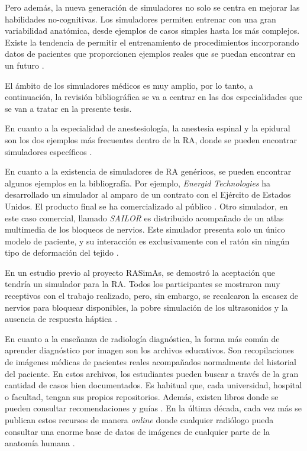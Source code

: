 Pero además, la nueva generación de simuladores no solo se centra en mejorar las habilidades no-cognitivas. Los simuladores permiten entrenar con una gran variabilidad anatómica, desde ejemplos de casos simples hasta los más complejos. Existe la tendencia de permitir el entrenamiento de procedimientos incorporando datos de pacientes que proporcionen ejemplos reales que se puedan encontrar en un futuro \cite{Willaert2012, ZHANG2017599}. 

El ámbito de los simuladores médicos es muy amplio, por lo tanto, a continuación, la revisión bibliográfica se va a centrar en las dos especialidades que se van a tratar en la presente tesis.


En cuanto a la especialidad de anestesiología, la anestesia espinal y la epidural son los dos ejemplos más frecuentes dentro de la \ac{RA}, donde se pueden encontrar simuladores específicos \cite{broom2018evaluation}. %

En cuanto a la existencia de simuladores de \ac{RA} genéricos, se pueden encontrar algunos ejemplos en la bibliografía. Por ejemplo, \emph{Energid Technologies} ha desarrollado  un simulador al amparo de un contrato con el Ejército de Estados Unidos. El producto final  se ha comercializado al público \cite{lim2008simulation}.
Otro simulador, en este caso comercial, llamado \emph{SAILOR} es distribuido acompañado de un atlas multimedia de los bloqueos de nervios. Este simulador presenta solo un único modelo de paciente, y su interacción es exclusivamente con el ratón sin ningún tipo de deformación del tejido \cite{Bibin}. 

En un estudio previo al proyecto \ac{RASimAs}, se demostró la aceptación que tendría un simulador para la \ac{RA}. Todos los participantes se mostraron muy receptivos con el trabajo realizado, pero, sin embargo, se recalcaron la escasez de nervios para bloquear disponibles, la pobre simulación de los ultrasonidos y la ausencia de respuesta háptica \cite{Grottke2009594}.


En cuanto a la enseñanza de radiología diagnóstica, la forma más común de aprender diagnóstico por imagen son los archivos educativos. Son recopilaciones de imágenes médicas de pacientes reales acompañados normalmente del historial del paciente. En estos archivos, los estudiantes pueden buscar a través de la gran cantidad de casos bien documentados. Es habitual que, cada universidad, hospital o facultad, tengan sus propios repositorios. Además, existen libros donde se pueden consultar recomendaciones y guías \cite{carver2012medical,manualpractico}. 
En la última década, cada vez más se publican estos recursos de manera \emph{online} donde cualquier radiólogo pueda consultar una enorme base de datos de imágenes de cualquier parte de la anatomía humana \cite{deshpande2017integrated}. 

